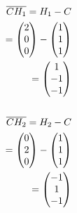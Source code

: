 \begin{align*}
    \overline{CH_1} = H_1 - C                                                                                                                          \\
    = \begin{pmatrix}
          2 \\ 0 \\ 0
      \end{pmatrix} - \begin{pmatrix}
                          1 \\ 1 \\ 1
                      \end{pmatrix}                                                                                                                   \\
    = \begin{pmatrix}
          1 \\ -1 \\ -1
      \end{pmatrix}                                                                                                                                   \\\\
    \overline{CH_2} = H_2 - C                                                                                                                          \\
    = \begin{pmatrix}
          0 \\ 2 \\ 0
      \end{pmatrix} - \begin{pmatrix}
                          1 \\ 1 \\ 1
                      \end{pmatrix}                                                                                                                   \\
    = \begin{pmatrix}
          -1 \\ 1 \\ -1
      \end{pmatrix}                                                                                                                                   \\\\ \pagebreak[2]

\end{align*}
